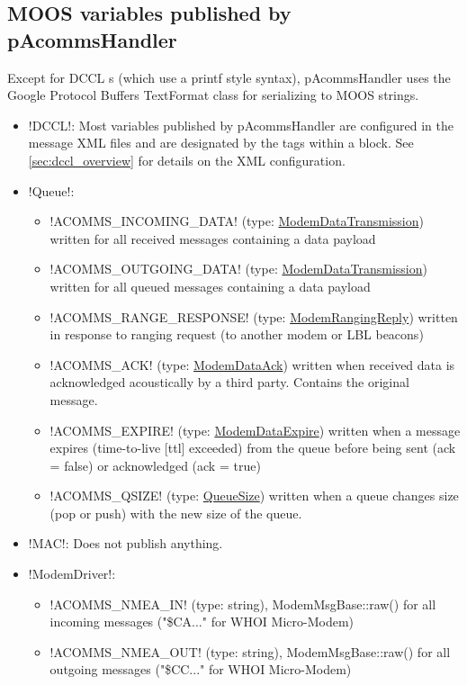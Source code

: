 \subsection{MOOS variables published by pAcommsHandler}

Except for DCCL s (which use a printf style syntax), pAcommsHandler uses the Google Protocol Buffers TextFormat class for serializing to MOOS strings. 

\begin{itemize}
\item !DCCL!: Most variables published by pAcommsHandler are configured in the message XML files and are designated by the tags  within a  block. See \ref{sec:dccl_overview} for details on the XML configuration. 
\item !Queue!:
\begin{itemize}
\item !ACOMMS_INCOMING_DATA! (type: \href{http://gobysoft.com/doc/modem__message_8proto_source.html}{ModemDataTransmission}) written for all received messages containing a data payload
\item !ACOMMS_OUTGOING_DATA! (type: \href{http://gobysoft.com/doc/modem__message_8proto_source.html}{ModemDataTransmission}) written for all queued messages containing a data payload
\item !ACOMMS_RANGE_RESPONSE! (type: \href{http://gobysoft.com/doc/modem__message_8proto_source.html}{ModemRangingReply}) written in response to ranging request (to another modem or LBL beacons)
\item !ACOMMS_ACK! (type: \href{http://gobysoft.com/doc/modem__message_8proto_source.html}{ModemDataAck}) written when received data is acknowledged acoustically by a third party. Contains the original message.
\item !ACOMMS_EXPIRE! (type: \href{http://gobysoft.com/doc/modem__message_8proto_source.html}{ModemDataExpire}) written when a message expires (time-to-live [ttl] exceeded) from the queue before being sent (ack = false) or acknowledged (ack = true)
\item !ACOMMS_QSIZE! (type: \href{http://gobysoft.com/doc/queue_8proto_source.html}{QueueSize}) written when a queue changes size (pop or push) with the new size of the queue.
\end{itemize}
\item !MAC!: Does not publish anything.
\item !ModemDriver!: 
\begin{itemize}
\item !ACOMMS_NMEA_IN! (type: string), ModemMsgBase::raw() for all incoming messages ("\$CA..." for WHOI Micro-Modem)
\item !ACOMMS_NMEA_OUT! (type: string), ModemMsgBase::raw() for all outgoing messages ("\$CC..." for WHOI Micro-Modem)
\end{itemize}
\end{itemize}

